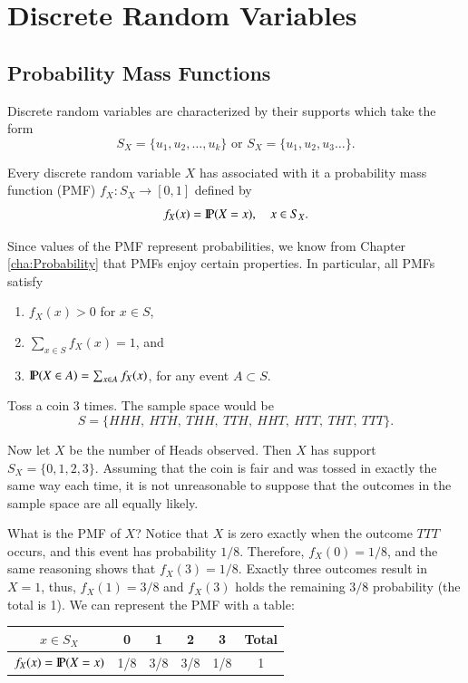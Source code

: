 \documentclass[captions=tableheading]{scrbook}
\begin{document}
\section{Discrete Random Variables}
\label{sec-1-1}

\label{sec:discrete-random-variables}
\subsection{Probability Mass Functions}
\label{sec-1-1-1}

\label{sub:probability-mass-functions}

Discrete random variables are characterized by their supports which take the form
\begin{equation}
S_{X}=\{u_{1},u_{2},\ldots,u_{k}\}\mbox{ or }S_{X}=\{u_{1},u_{2},u_{3}\ldots\}.
\end{equation}

Every discrete random variable \(X\) has associated with it a probability mass function (PMF) \(f_{X}:S_{X}\to[0,1]\) defined by
\begin{equation}
f_{X}(x)=\P(X=x),\quad x\in S_{X}.
\end{equation}

Since values of the PMF represent probabilities, we know from Chapter \ref{cha:Probability} that PMFs enjoy certain properties. In particular, all PMFs satisfy

\begin{enumerate}
\item \(f_{X}(x)>0\) for \(x\in S\),
\item \(\sum_{x\in S}f_{X}(x)=1\), and
\item \(\P(X\in A)=\sum_{x\in A}f_{X}(x)\), for any event \(A\subset S\).
\end{enumerate}

\begin{example}
\label{exa:Toss-a-coin}

Toss a coin 3 times. The sample space would be
\[
S=\{ HHH,\ HTH,\ THH,\ TTH,\ HHT,\ HTT,\ THT,\ TTT\}.
\]

Now let \(X\) be the number of Heads observed. Then \(X\) has support \(S_{X}=\{ 0,1,2,3\} \). Assuming that the coin is fair and was tossed in exactly the same way each time, it is not unreasonable to suppose that the outcomes in the sample space are all equally likely. 

What is the PMF of \(X\)? Notice that \(X\) is zero exactly when the outcome \(TTT\) occurs, and this event has probability \(1/8\). Therefore, \(f_{X}(0)=1/8\), and the same reasoning shows that \(f_{X}(3)=1/8\). Exactly three outcomes result in \(X=1\), thus, \(f_{X}(1)=3/8\) and \(f_{X}(3)\) holds the remaining \(3/8\) probability (the total is 1). We can represent the PMF with a table:

\begin{table}[H]
\begin{tabular}{c|cccc|c}
\(x\in S_{X}\) & 0 & 1 & 2 & 3 & Total\tabularnewline
\hline
\(f_{X}(x)=\P(X=x)\) & 1/8 & 3/8 & 3/8 & 1/8 & 1\tabularnewline
\end{tabular}
\end{table}

\end{example}
\end{document}
